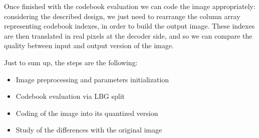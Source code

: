 \documentclass{report}
\begin{document}
Once finished with the codebook evaluation we can code the image appropriately: considering the described design, we just need to rearrange the column array representing codebook indexes, in order to build the output image. These indexes are then translated in real pixels at the decoder side, and so we can compare the quality between input and output version of the image.

Just to sum up, the steps are the following:
\begin{itemize}
	\item Image preprocessing and parameters initialization
	\item Codebook evaluation via LBG split
	\item Coding of the image into its quantized version
	\item Study of the differences with the original image
\end{itemize}
\end{document}
